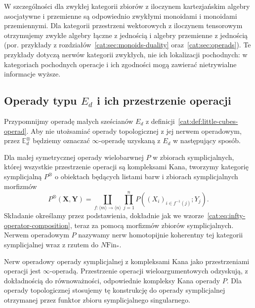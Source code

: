 W szczególności dla zwykłej kategorii zbiorów z iloczynem kartezjańskim algebry asocjatywne i przemienne są odpowiednio zwykłymi monoidami i monoidami przemiennymi. Dla kategorii przestrzeni wektorowych z iloczynem tensorowym otrzymujemy zwykłe algebry łączne z jednością i algebry przemienne z jednością (por. przykłady z rozdziałów~\ref{cat:sec:monoids-duality} oraz~\ref{cat:sec:operads}). Te przykłady dotyczą nerwów kategorii zwykłych, nie ich lokalizacji pochodnych: w kategoriach pochodnych operacje i ich zgodności mogą zawierać nietrywialne informacje wyższe.

\subsection{Operady typu \texorpdfstring{$E_d$}{Ed} i ich przestrzenie operacji}

Przypomnijmy operadę małych sześcianów $E_d$ z definicji~\ref{cat:def:little-cubes-operad}. Aby nie utożsamiać operady topologicznej z jej nerwem operadowym, przez $\mathbb E_d^\otimes$ będziemy oznaczać $\infty$-operadę uzyskaną z $E_d$ w następujący sposób.

\begin{definicja}\label{cat:def:infty-simplicial-operadic-nerve}
Dla małej symetrycznej operady wielobarwnej $P$ w zbiorach symplicjalnych, której wszystkie przestrzenie operacji są kompleksami Kana, tworzymy kategorię symplicjalną $P^\otimes$ o obiektach będących listami barw i zbiorach symplicjalnych morfizmów
\[
 P^\otimes(\mathbf X,\mathbf Y)=
 \coprod_{f:\langle m\rangle\to\langle n\rangle}
 \prod_{j=1}^nP((X_i)_{i\in f^{-1}(j)};Y_j).
\]
Składanie określamy przez podstawienia, dokładnie jak we wzorze~\eqref{cat:eq:infty-operator-composition}, teraz za pomocą morfizmów zbiorów symplicjalnych. Nerwem operadowym $P$ nazywamy nerw homotopijnie koherentny tej kategorii symplicjalnej wraz z rzutem do $N\mathrm{Fin}_*$.
\end{definicja}

\begin{twierdzenie}\label{cat:thm:infty-simplicial-operadic-nerve}
Nerw operadowy operady symplicjalnej z kompleksami Kana jako przestrzeniami operacji jest $\infty$-operadą. Przestrzenie operacji wieloargumentowych odzyskują, z dokładnością do równoważności, odpowiednie kompleksy Kana operady $P$. Dla operady topologicznej stosujemy tę konstrukcję do operady symplicjalnej otrzymanej przez funktor zbioru symplicjalnego singularnego.
\end{twierdzenie}

